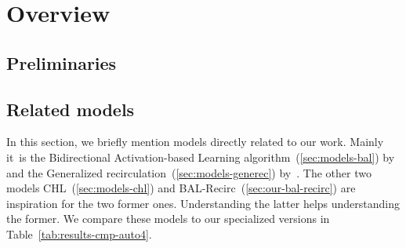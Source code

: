 



\section{Overview}
\label{sec:overview} 

\subsection{Preliminaries}
\label{sec:theory} 

 



\subsection{Related models}
\label{sec:overview-models}  

In this section, we briefly mention models directly related to our work. Mainly it~is the Bidirectional Activation-based Learning algorithm~(\ref{sec:models-bal}) by~\citet{farkas2013bal} and the Generalized recirculation~(\ref{sec:models-generec}) by~\citet{o1996bio}. The other two models CHL~(\ref{sec:models-chl}) and BAL-Recirc~(\ref{sec:our-bal-recirc}) are inspiration for the two former ones. Understanding the latter helps understanding the former. We compare these models to our specialized versions in Table~\ref{tab:results-cmp-auto4}. 










 
